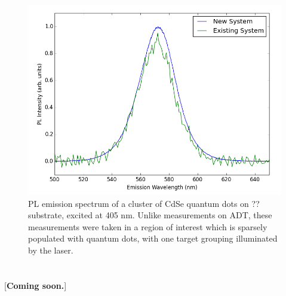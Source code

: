 \begin{figure}[h]
    \centering
    \includegraphics[width=\textwidth]{./img/qd-2.png}
    \caption{PL emission spectrum of a cluster of CdSe quantum dots on ?? substrate, excited at 405 nm. Unlike measurements on ADT, these measurements were taken in a region of interest which is sparsely populated with quantum dots, with one target grouping illuminated by the laser.}
    \label{fig:pl-adt-qd}
\end{figure}

\section{}

[\textbf{Coming soon.}]